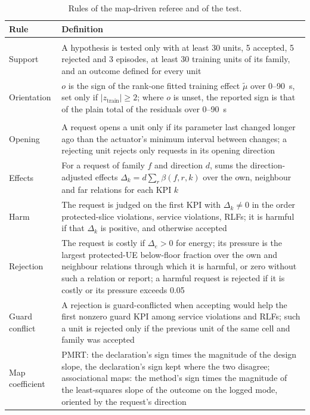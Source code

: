 \documentclass[pdflatex,sn-mathphys-num]{sn-jnl}%
\theoremstyle{thmstyleone}%
\theoremstyle{thmstyletwo}%
\theoremstyle{thmstylethree}%
\begin{document}
\begin{table}
\caption{Rules of the map-driven referee and of the test.}
\label{tab:s_rules}
\footnotesize
\setlength{\tabcolsep}{3pt}
\begin{tabular*}{\textwidth}{@{\extracolsep{\fill}}>{\raggedright}p{}>{\raggedright\arraybackslash}p{}@{}}
\toprule
Rule & Definition \\
\midrule
\multicolumn{2}{@{}l}{\textit{Test}} \\
Support & A hypothesis is tested only with at least 30 units, 5 accepted, 5 rejected and 3 episodes, at least 30 training units of its family, and an outcome defined for every unit \\
Orientation & $o$ is the sign of the rank-one fitted training effect $\tilde\mu$ over 0--90~s, set only if $|z_{\mathrm{train}}| \ge 2$; where $o$ is unset, the reported sign is that of the plain total of the residuals over 0--90~s \\
\midrule
\multicolumn{2}{@{}l}{\textit{Referee}} \\
Opening & A request opens a unit only if its parameter last changed longer ago than the actuator's minimum interval between changes; a rejecting unit rejects only requests in its opening direction \\
Effects & For a request of family $f$ and direction $d$, sums the direction-adjusted effects $\Delta_k = d \sum_r \beta(f, r, k)$ over the own, neighbour and far relations for each KPI $k$ \\
Harm & The request is judged on the first KPI with $\Delta_k \ne 0$ in the order protected-slice violations, service violations, RLFs; it is harmful if that $\Delta_k$ is positive, and otherwise accepted \\
Rejection & The request is costly if $\Delta_e > 0$ for energy; its pressure is the largest protected-UE below-floor fraction over the own and neighbour relations through which it is harmful, or zero without such a relation or report; a harmful request is rejected if it is costly or its pressure exceeds 0.05 \\
Guard conflict & A rejection is guard-conflicted when accepting would help the first nonzero guard KPI among service violations and RLFs; such a unit is rejected only if the previous unit of the same cell and family was accepted \\
Map coefficient & PMRT: the declaration's sign times the magnitude of the design slope, the declaration's sign kept where the two disagree; associational maps: the method's sign times the magnitude of the least-squares slope of the outcome on the logged mode, oriented by the request's direction \\

\end{tabular*}
\end{table}
\end{document}
